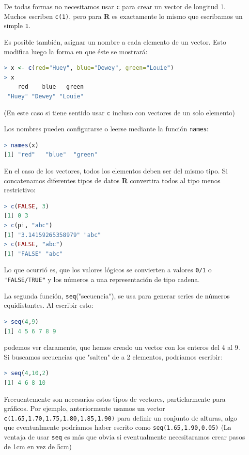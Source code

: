 \documentclass[spanish]{extbook}
\numberwithin{equation}{section}
\numberwithin{figure}{section}
\begin{document}
De todas formas no necesitamos usar \texttt{c} para crear un vector de longitud
1. Muchos escriben \texttt{c(1)}, pero para \textbf{R} es exactamente lo mismo
que escribamos un simple \texttt{1}.

Es posible también, asignar un nombre a cada elemento de un vector. Esto
modifica luego la forma en que éste se mostrará:

\begin{lstlisting}[language=R]
> x <- c(red="Huey", blue="Dewey", green="Louie")
> x
    red    blue   green 
 "Huey" "Dewey" "Louie"
\end{lstlisting}

(En este caso si tiene sentido usar \texttt{c} incluso con vectores de un solo
elemento)

Los nombres pueden configurarse o leerse mediante la función \texttt{names}:

\begin{lstlisting}[language=R]
> names(x)
[1] "red"   "blue"  "green"
\end{lstlisting}

En el caso de los vectores, todos los elementos deben ser del mismo tipo. Si
concatenamos diferentes tipos de datos \textbf{R} convertira todos al tipo menos
restrictivo:

\begin{lstlisting}[language=R]
> c(FALSE, 3)
[1] 0 3
> c(pi, "abc")
[1] "3.14159265358979" "abc"
> c(FALSE, "abc")
[1] "FALSE" "abc"
\end{lstlisting}

Lo que ocurrió es, que los valores lógicos se convierten a valores \texttt{0/1}
o \texttt{"FALSE/TRUE"} y los números a una representación de tipo cadena.

La segunda función, \texttt{seq}("secuencia"), se usa para generar series de
números equidistantes. Al escribir esto:

\begin{lstlisting}[language=R]
> seq(4,9)
[1] 4 5 6 7 8 9
\end{lstlisting}

podemos ver claramente, que hemos creado un vector con los enteros del 4 al 9.
Si buscamos secuencias que "salten" de a 2 elementos, podríamos escribir:

\begin{lstlisting}[language=R]
> seq(4,10,2)
[1] 4 6 8 10
\end{lstlisting}

Frecuentemente son necesarios estos tipos de vectores, particlarmente para
gráficos. Por ejemplo, anteriormente usamos un vector
\texttt{c(1.65,1.70,1.75,1.80,1.85,1.90)} para definir un conjunto de alturas,
algo que eventualmente podríamos haber escrito como
\texttt{seq(1.65,1.90,0.05)} (La ventaja de usar \texttt{seq} es más que obvia
si eventualmente necesitaramos crear pasos de 1cm en vez de 5cm)
\end{document}
